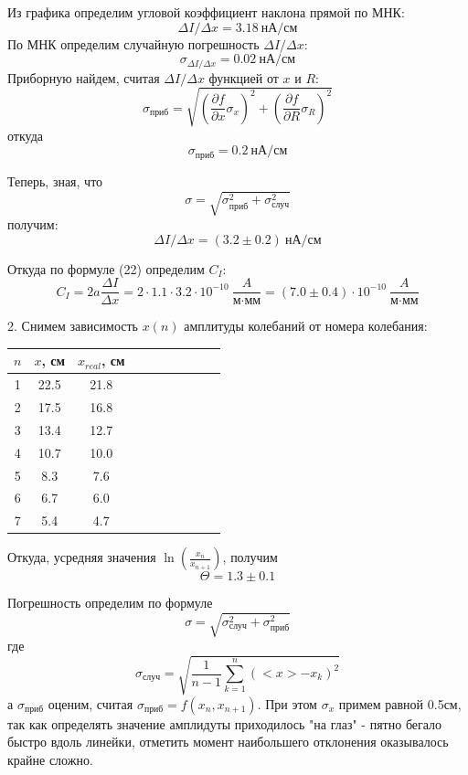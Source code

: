 \documentclass[14pt]{article}
\begin{document}
Из графика определим угловой коэффициент наклона прямой по МНК: 
$$
	\Delta I/\Delta x = 3.18~\text{нА}/\text{см}
$$
По МНК определим случайную погрешность $\Delta I/\Delta x$:
$$
	\sigma_{\Delta I/\Delta x} = 0.02~\text{нА/см}
$$
Приборную найдем, считая $\Delta I/\Delta x$ функцией от $x$ и $R$:
$$
	\sigma_\text{приб} = \sqrt{\left(\frac{\partial f}{\partial x}\sigma_x\right)^2 + \left(\frac{\partial f}{\partial R}\sigma_R\right)^2}
$$
\noindent откуда
$$
	\sigma_\text{приб} = 0.2~\text{нА/см}
$$

\noindent Теперь, зная, что 
$$
	\sigma = \sqrt{\sigma_\text{приб}^2 + \sigma_\text{случ}^2}
$$
\noindent получим:
$$
	\Delta I/\Delta x = (3.2 \pm 0.2)~\text{нА}/\text{см}
$$

\noindent Откуда по формуле (22) определим $C_I$:
$$
	C_I = 2a\frac{\Delta I}{\Delta x} = 2\cdot1.1\cdot3.2\cdot10^{-10}~\frac{A}{\text{м}\cdot\text{мм}} = (7.0 \pm 0.4)\cdot10^{-10}~\frac{A}{\text{м}\cdot\text{мм}}
$$


\vspace{1cm}
2. Снимем зависимость $x(n)$ амплитуды колебаний от номера колебания:

\begin{center}
\begin{tabular}{|c|c|c|c|c|c|c|c|c|c|}
\hline
$n$	&	$x$, см	&	$x_{real}$, см	\\
\hline
1	&	22.5	&	21.8			\\
\hline
2	&	17.5	&	16.8			\\
\hline
3	&	13.4	&	12.7			\\
\hline
4	&	10.7	&	10.0			\\
\hline
5	&	8.3		&	7.6				\\
\hline
6	&	6.7		&	6.0				\\
\hline
7	&	5.4		&	4.7				\\
\hline
\end{tabular}
\end{center}

Откуда, усредняя значения $\ln\left(\frac{x_n}{x_{n+1}}\right)$, получим
$$
	\Theta = 1.3 \pm 0.1
$$

Погрешность определим по формуле
$$
	\sigma = \sqrt{\sigma_{\text{случ}}^2 + \sigma_{\text{приб}}^2}
$$
\noindent где
$$
	\sigma_{\text{случ}} = \sqrt{\frac{1}{n - 1}\sum_{k = 1}^n (<x> - x_k)^2}
$$
\noindent а $\sigma_{\text{приб}}$ оценим, считая $\sigma_{\text{приб}} = f(x_n, x_{n+1})$. При этом $\sigma_x$ примем равной 0.5см, так как определять значение амплидуты приходилось "на глаз" - пятно бегало быстро вдоль линейки, отметить момент наибольшего отклонения оказывалось крайне сложно.
\end{document}
